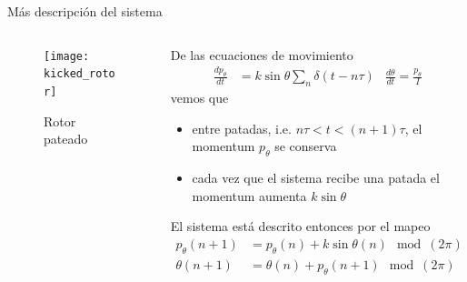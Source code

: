 \documentclass[aspectratio=169,xcolor=dvipsnames,7pt]{beamer}
\begin{document}
\begin{frame}{Más descripción del sistema}

\begin{columns}
\begin{column}{0.5\textwidth}  %
		\vspace*{-.4cm}
    \begin{figure}
     \texttt{[image: kicked\_rotor]}
     \vspace*{-5mm}
     \caption{\normalsize Rotor pateado}
     \end{figure}
\end{column}

\begin{column}{0.5\textwidth}
De las ecuaciones de movimiento  
\begin{align*}
\frac{dp_{\theta}}{dt} &= k\sin\theta\sum_n\delta(t - n\tau) &
\frac{d\theta}{dt} = \frac{p_{\theta}}{I}
\end{align*}
vemos que 
\begin{itemize}
\item entre patadas, i.e. $n\tau<t<(n+1)\tau$, el momentum $p_\theta$ se
conserva
\item cada vez que el sistema recibe una patada el momentum aumenta $k\sin\theta$
\end{itemize}

El sistema está descrito entonces por el mapeo 
\begin{align*}
p_\theta(n+1) &= p_\theta(n) + k\sin\theta(n)\mod{(2\pi)} \\
\theta(n+1) &= \theta(n) + p_\theta(n+1)\mod{(2\pi)}
\end{align*}
\end{column}
\end{columns}

\end{frame}
\end{document}
